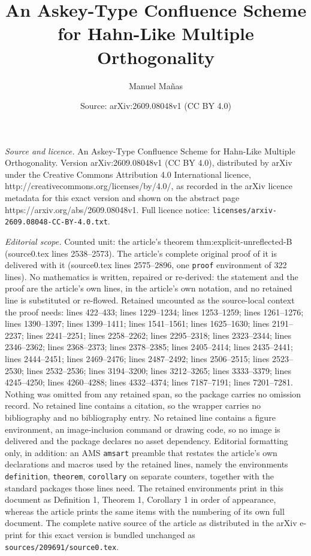 \documentclass[10pt,a4paper]{amsart}
\title{An Askey-Type Confluence Scheme for Hahn-Like Multiple Orthogonality}
\author{Manuel Ma\~nas}
\date{Source: arXiv:2609.08048v1 (CC BY 4.0)}
\begin{document}
\maketitle

\noindent\emph{Source and licence.} An Askey-Type Confluence Scheme for Hahn-Like Multiple Orthogonality. Version arXiv:2609.08048v1 (CC BY 4.0), distributed by arXiv under the Creative Commons Attribution 4.0 International licence, http://creativecommons.org/licenses/by/4.0/, as recorded in the arXiv licence metadata for this exact version and shown on the abstract page https://arxiv.org/abs/2609.08048v1. Full licence notice: \texttt{licenses/arxiv-2609.08048-CC-BY-4.0.txt}.\par\smallskip

\noindent\textit{Editorial scope.} Counted unit: the article's theorem thm:explicit-unreflected-B (source0.tex lines 2538--2573). The article's complete original proof of it is delivered with it (source0.tex lines 2575--2896, one \texttt{proof} environment of 322 lines). No mathematics is written, repaired or re-derived: the statement and the proof are the article's own lines, in the article's own notation, and no retained line is substituted or re-flowed.  Retained uncounted as the source-local context the proof needs: lines 422--433; lines 1229--1234; lines 1253--1259; lines 1261--1276; lines 1390--1397; lines 1399--1411; lines 1541--1561; lines 1625--1630; lines 2191--2237; lines 2241--2251; lines 2258--2262; lines 2295--2318; lines 2323--2344; lines 2346--2362; lines 2368--2373; lines 2378--2385; lines 2405--2414; lines 2435--2441; lines 2444--2451; lines 2469--2476; lines 2487--2492; lines 2506--2515; lines 2523--2530; lines 2532--2536; lines 3194--3200; lines 3212--3265; lines 3333--3379; lines 4245--4250; lines 4260--4288; lines 4332--4374; lines 7187--7191; lines 7201--7281.  Nothing was omitted from any retained span, so the package carries no omission record.  No retained line contains a citation, so the wrapper carries no bibliography and no bibliography entry.  No retained line contains a figure environment, an image-inclusion command or drawing code, so no image is delivered and the package declares no asset dependency.  Editorial formatting only, in addition: an AMS \texttt{amsart} preamble that restates the article's own declarations and macros used by the retained lines, namely the environments \texttt{definition}, \texttt{theorem}, \texttt{corollary} on separate counters, together with the standard packages those lines need.  The retained environments print in this document as Definition 1, Theorem 1, Corollary 1 in order of appearance, whereas the article prints the same items with the numbering of its own full document.  The complete native source of the article as distributed in the arXiv e-print for this exact version is bundled unchanged as \texttt{sources/209691/source0.tex}.
\end{document}
